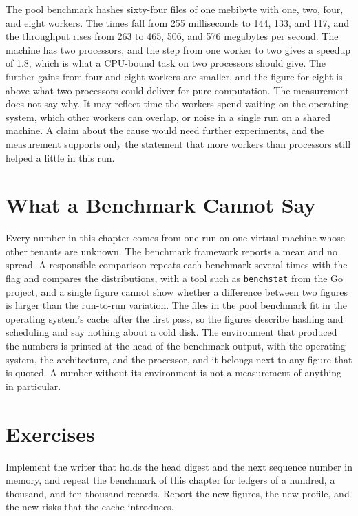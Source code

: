 The pool benchmark hashes sixty-four files of one mebibyte with one, two, four, and eight workers. The times fall from 255 milliseconds to 144, 133, and 117, and the throughput rises from 263 to 465, 506, and 576 megabytes per second. The machine has two processors, and the step from one worker to two gives a speedup of 1.8, which is what a CPU-bound task on two processors should give. The further gains from four and eight workers are smaller, and the figure for eight is above what two processors could deliver for pure computation. The measurement does not say why. It may reflect time the workers spend waiting on the operating system, which other workers can overlap, or noise in a single run on a shared machine. A claim about the cause would need further experiments, and the measurement supports only the statement that more workers than processors still helped a little in this run.

\section{What a Benchmark Cannot Say}

Every number in this chapter comes from one run on one virtual machine whose other tenants are unknown. The benchmark framework reports a mean and no spread. A responsible comparison repeats each benchmark several times with the  flag and compares the distributions, with a tool such as \texttt{benchstat} from the Go project, and a single figure cannot show whether a difference between two figures is larger than the run-to-run variation. The files in the pool benchmark fit in the operating system's cache after the first pass, so the figures describe hashing and scheduling and say nothing about a cold disk. The environment that produced the numbers is printed at the head of the benchmark output, with the operating system, the architecture, and the processor, and it belongs next to any figure that is quoted. A number without its environment is not a measurement of anything in particular.

\section*{Exercises}

\begin{exercise}
Implement the writer that holds the head digest and the next sequence number in memory, and repeat the benchmark of this chapter for ledgers of a hundred, a thousand, and ten thousand records. Report the new figures, the new profile, and the new risks that the cache introduces.
\end{exercise}

